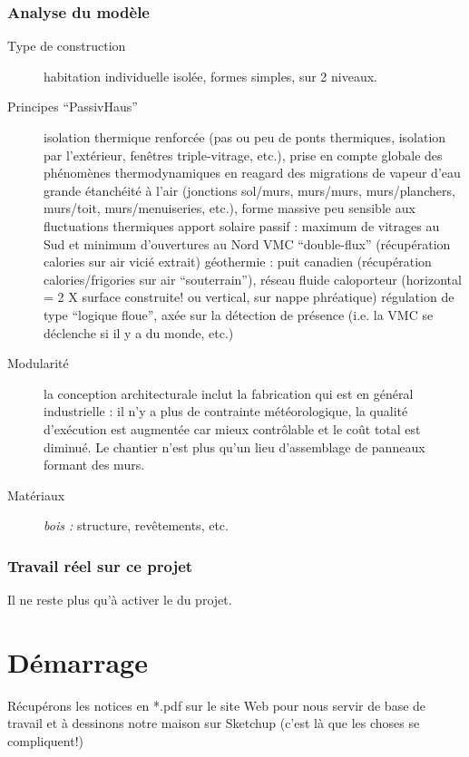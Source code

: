 \documentclass[a4paper,12pt,french]{sphinxmanual}
\begin{document}
\subsubsection{Analyse du modèle}
\label{init_su+acad/intro:analyse-du-modele}\begin{description}
\item[{Type de construction}] \leavevmode
habitation individuelle isolée,
formes simples, sur 2 niveaux.

\item[{Principes ``PassivHaus''}] \leavevmode
isolation thermique renforcée (pas ou peu de ponts thermiques, isolation par l'extérieur, fenêtres triple-vitrage, etc.),
prise en compte globale des phénomènes thermodynamiques en reagard des migrations de vapeur d'eau
grande étanchéité à l'air (jonctions sol/murs, murs/murs, murs/planchers, murs/toit, murs/menuiseries, etc.),
forme massive peu sensible aux fluctuations thermiques
apport solaire passif : maximum de vitrages au Sud et minimum d'ouvertures au Nord
VMC ``double-flux'' (récupération calories sur air vicié extrait)
géothermie : puit canadien (récupération calories/frigories sur air ``souterrain''), réseau fluide caloporteur (horizontal = 2 X surface construite! ou vertical, sur nappe phréatique)
régulation de type ``logique floue'', axée sur la détection de présence (i.e. la VMC se déclenche si il y a du monde, etc.)

\item[{Modularité}] \leavevmode
la conception architecturale inclut la fabrication qui est en général industrielle : il n'y a plus de contrainte météorologique, la qualité d'exécution est augmentée car mieux contrôlable et le coût total est diminué.
Le chantier n'est plus qu'un lieu d'assemblage de panneaux formant des murs.

\item[{Matériaux}] \leavevmode
\emph{bois :} structure, revêtements, etc.

\end{description}


\subsubsection{Travail réel sur ce projet}
\label{init_su+acad/intro:travail-reel-sur-ce-projet}
Il ne reste plus qu'à activer le {\hyperref[init_su+acad/demarrage:demarrage\string-init\string-su\string-acad]{}} du projet.


\section{Démarrage}
\label{init_su+acad/demarrage:demarrage-init-su-acad}\label{init_su+acad/demarrage::doc}\label{init_su+acad/demarrage:demarrage}
Récupérons les notices en *.pdf sur le site Web pour nous servir de base de travail et à dessinons notre maison sur Sketchup (c'est là que les choses se compliquent!)
\end{document}
